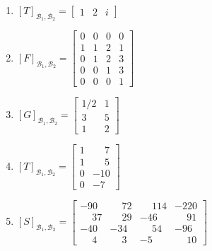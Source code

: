 \documentclass[12pt]{exam}
\begin{document}
\begin{exercicio}
\begin{solucao}
\begin{enumerate}[label={\alph*})]
            \item $[T]_{\mathcal{B}_1, \mathcal{B}_2} = \begin{bmatrix}
                1 & 2 & i
            \end{bmatrix}$

            \item $[F]_{\mathcal{B}_1, \mathcal{B}_2} = \begin{bmatrix}
                0 & 0 & 0 & 0\\
                1 & 1 & 2 & 1\\
                0 & 1 & 2 & 3\\
                0 & 0 & 1 & 3\\
                0 & 0 & 0 & 1
            \end{bmatrix}$

            \item $[G]_{\mathcal{B}_1, \mathcal{B}_2} = \begin{bmatrix}
                1/2 & 1\\
                3 & 5\\
                1 & 2
            \end{bmatrix}$

            \item $[T]_{\mathcal{B}_1, \mathcal{B}_2} = \begin{bmatrix}
                1 & \phantom{-}7\\
                1 & \phantom{-}5\\
                0 & -10\\
                0 & -7
            \end{bmatrix}$

            \item $[S]_{\mathcal{B}_1, \mathcal{B}_2} = \begin{bmatrix}
                -90 & \phantom{-}72 & \phantom{-}114 & -220\\
                \phantom{-}37 & \phantom{-}29 & -46 & \phantom{-}91\\
                -40 & -34 & \phantom{-}54 & -96\\
                \phantom{-}4 & \phantom{-}3 & -5 & \phantom{-}10
            \end{bmatrix}$
        \end{enumerate}
    \end{solucao}
\end{exercicio}
\end{document}
